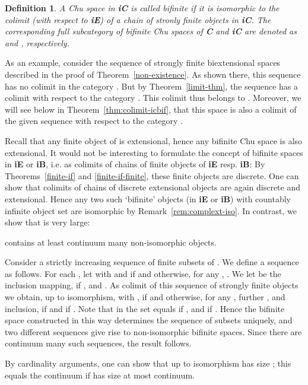 \documentclass{LMCS}
\let\pf\proof
\let\epf\endproof
\newtheorem{defn}{Definition}[section]
\begin{document}
\begin{defn}
  A Chu space in {\bf iC} is called bifinite if it is isomorphic to
  the colimit (with respect to {\bf iE}) of a chain of stronly finite
  objects in {\bf iC}.  The corresponding full subcategory of bifinite
  Chu spaces of {\bf C} and {\bf iC} are denoted as  and , respectively. 
\end{defn}

As an example, consider the sequence of strongly finite biextensional
spaces  described in the proof of
Theorem~\ref{non-existence}.  As shown there, this sequence has no
colimit in the category .  But by
Theorem~\ref{limit-thm}, the sequence has a colimit with respect to
the category . This colimit thus belongs to
.  Moreover, we will see below in
Theorem~\ref{thm:colimit-icbif}, that this space is also a colimit
of the given sequence with respect to the category . 

Recall that any finite object of  is extensional, hence
any bifinite Chu space is also extensional. It would not be
interesting to formulate the concept of bifinite spaces in \textbf{iE}
or \textbf{iB}, i.e. as colimits of chains of finite objects of
\textbf{iE} resp. \textbf{iB}: By Theorems~\ref{finite-if} and
\ref{finite-if-finite}, these finite objects are discrete. One can show that
colimits of chains of discrete extensional objects are again discrete
and extensional. Hence any two such `bifinite' objects (in \textbf{iE}
or \textbf{iB}) with countably infinite object set are isomorphic by
Remark~\ref{rem:complext-iso}. In contrast, we show that
 is very large:

\begin{prop}
 contains at least
continuum  many non-isomorphic objects. 
\end{prop}

\pf Consider a strictly increasing sequence of finite subsets  of . We
define a sequence  as follows. 
For each , let  with
 and  if  and  otherwise, for any , . We let
 be the inclusion mapping,  if , and . As colimit of this
sequence of strongly finite objects we obtain, up to isomorphism,
 with
,  if
 and  otherwise, for any ,
further , and  inclusion, 
if  and  if .  Note that in  the set  equals  if , and
 if . Hence the bifinite space 
constructed in this way determines the sequence of subsets  uniquely, and two different sequences give rise to
non-isomorphic bifinite spaces.  Since there are continuum  many such
sequences, the result follows.  \epf

\begin{rem}
  By cardinality arguments, one can show that up to isomorphism
   has size ; this equals the
  continuum   if  has size at most continuum. 
\end{rem}
\end{document}
